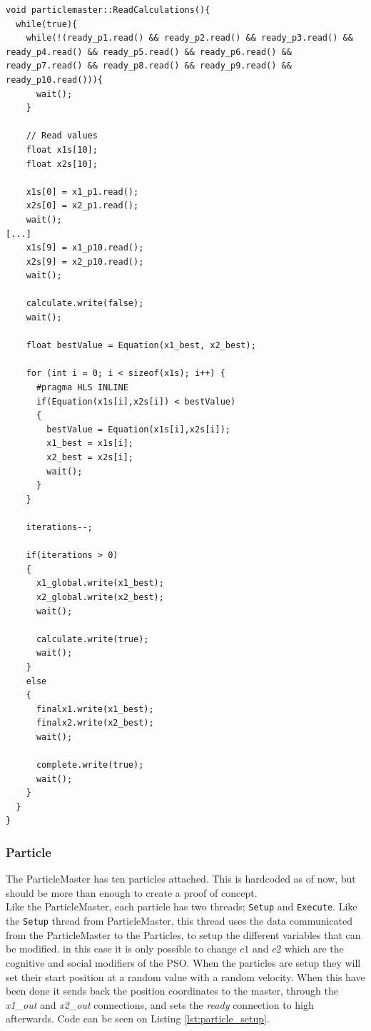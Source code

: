 \begin{lstlisting}[style=customc++, label={lst:particlemaster_readcalculations}, caption={ReadCalculations thread of ParticleMaster.}]
void particlemaster::ReadCalculations(){
  while(true){
    while(!(ready_p1.read() && ready_p2.read() && ready_p3.read() && ready_p4.read() && ready_p5.read() && ready_p6.read() && ready_p7.read() && ready_p8.read() && ready_p9.read() && ready_p10.read())){
      wait();
    }

    // Read values
    float x1s[10];
    float x2s[10];

    x1s[0] = x1_p1.read();
    x2s[0] = x2_p1.read();
    wait();
[...]
    x1s[9] = x1_p10.read();
    x2s[9] = x2_p10.read();
    wait();

    calculate.write(false);
    wait();

    float bestValue = Equation(x1_best, x2_best);

    for (int i = 0; i < sizeof(x1s); i++) {
      #pragma HLS INLINE
      if(Equation(x1s[i],x2s[i]) < bestValue)
      {
        bestValue = Equation(x1s[i],x2s[i]);
        x1_best = x1s[i];
        x2_best = x2s[i];
        wait();
      }
    }

    iterations--;

    if(iterations > 0)
    {
      x1_global.write(x1_best);
      x2_global.write(x2_best);
      wait();

      calculate.write(true);
      wait();
    }
    else
    {
      finalx1.write(x1_best);
      finalx2.write(x2_best);
      wait();

      complete.write(true);
      wait();
    }
  }
}
\end{lstlisting}

\subsubsection{Particle}
The ParticleMaster has ten particles attached. This is hardcoded as of now, but should be more than enough to create a proof of concept.\\

Like the ParticleMaster, each particle has two threads; \texttt{Setup} and \texttt{Execute}. Like the \texttt{Setup} thread from ParticleMaster, this thread uses the data communicated from the ParticleMaster to the Particles, to setup the different variables that can be modified. in this case it is only possible to change $c1$ and $c2$ which are the cognitive and social modifiers of the PSO. When the particles are setup they will set their start position at a random value with a random velocity. When this have been done it sends back the position coordinates to the master, through the \textit{x1\_out} and \textit{x2\_out} connections, and sets the \textit{ready} connection to high afterwards. Code can be seen on Listing \ref{lst:particle_setup}.\\

